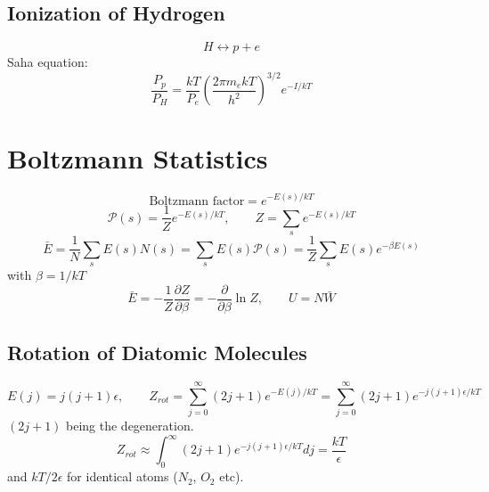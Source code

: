 \documentclass[a4paper,norsk, 10pt]{article}
\begin{document}
\subsection{Ionization of Hydrogen}
\begin{equation}
H \leftrightarrow p + e
\end{equation}
Saha equation:
\begin{equation}
\frac{P_p}{P_H} = \frac{kT}{P_e}\left(\frac{2\pi m_e kT}{h^2}\right)^{3/2}e^{-I/kT}
\end{equation}

\section{Boltzmann Statistics}
\begin{equation}
\text{Boltzmann factor} = e^{-E(s)/kT}
\end{equation}
\begin{equation}
\mathcal{P}(s) = \frac{1}{Z}e^{-E(s)/kT},\qquad Z = \sum_s e^{-E(s)/kT}
\end{equation}
\begin{equation}
\bar{E} = \frac{1}{N}\sum_s E(s)N(s) = \sum_s E(s) \mathcal{P}(s) = \frac{1}{Z}\sum_s E(s) e^{-\beta E(s)}
\end{equation}
with $\beta = 1/kT$
\begin{equation}
\bar{E} = -\frac{1}{Z}\frac{\partial Z}{\partial \beta} = -\frac{\partial}{\partial \beta}\ln Z, \qquad U = N\bar{W}
\end{equation}
\subsection{Rotation of Diatomic Molecules}
\begin{equation}
E(j) = j(j+1)\epsilon, \qquad Z_{rot} = \sum_{j=0}^{\infty}(2j+1)e^{-E(j)/kT} = \sum_{j=0}^{\infty}(2j+1)e^{-j(j+1)\epsilon/kT}
\end{equation}
$(2j+1)$ being the degeneration.
\begin{equation}
Z_{rot} \approx \int_{0}^{\infty}(2j+1)e^{-j(j+1)\epsilon/kT} dj = \frac{kT}{\epsilon}
\end{equation}
and $kT/2\epsilon$ for identical atoms ($N_2$, $O_2$ etc).
\end{document}
